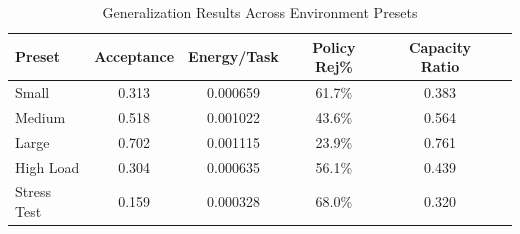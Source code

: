 \begin{table}[h]
\centering
\caption{Generalization Results Across Environment Presets}
\label{tab:generalization}
\begin{tabular}{lccccc}
\toprule
Preset & Acceptance & Energy/Task & Policy Rej\% & Capacity Ratio \\
\midrule
Small & 0.313 & 0.000659 & 61.7\% & 0.383 \\
Medium & 0.518 & 0.001022 & 43.6\% & 0.564 \\
Large & 0.702 & 0.001115 & 23.9\% & 0.761 \\
High Load & 0.304 & 0.000635 & 56.1\% & 0.439 \\
Stress Test & 0.159 & 0.000328 & 68.0\% & 0.320 \\
\bottomrule
\end{tabular}
\end{table}
